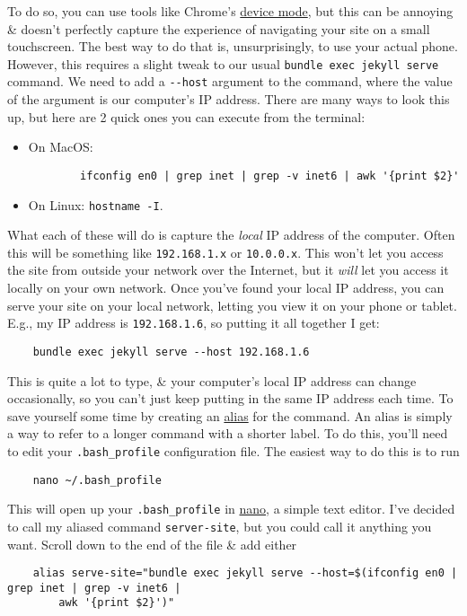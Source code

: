 \documentclass{article}
\numberwithin{equation}{section}
\begin{document}
To do so, you can use tools like Chrome's \href{https://developers.google.com/web/tools/chrome-devtools/device-mode}{device mode}, but this can be annoying \& doesn't perfectly capture the experience of navigating your site on a small touchscreen. The best way to do that is, unsurprisingly, to use your actual phone. However, this requires a slight tweak to our usual \verb|bundle exec jekyll serve| command. We need to add a \verb|--host| argument to the command, where the value of the argument is our computer's IP address. There are many ways to look this up, but here are 2 quick ones you can execute from the terminal:
\begin{itemize}
	\item On MacOS:
	\begin{verbatim}
		ifconfig en0 | grep inet | grep -v inet6 | awk '{print $2}'
	\end{verbatim}
	\item On Linux: \verb|hostname -I|.
\end{itemize}
What each of these will do is capture the \textit{local} IP address of the computer. Often this will be something like \texttt{192.168.1.x} or \texttt{10.0.0.x}. This won't let you access the site from outside your network over the Internet, but it \textit{will} let you access it locally on your own network. Once you've found your local IP address, you can serve your site on your local network, letting you view it on your phone or tablet. E.g., my IP address is \texttt{192.168.1.6}, so putting it all together I get:
\begin{verbatim}
	bundle exec jekyll serve --host 192.168.1.6
\end{verbatim}
This is quite a lot to type, \& your computer's local IP address can change occasionally, so you can't just keep putting in the same IP address each time. To save yourself some time by creating an \href{https://en.wikipedia.org/wiki/Alias_(command)}{alias} for the command. An alias is simply a way to refer to a longer command with a shorter label. To do this, you'll need to edit your \verb|.bash_profile| configuration file. The easiest way to do this is to run
\begin{verbatim}
	nano ~/.bash_profile
\end{verbatim}
This will open up your \verb|.bash_profile| in \href{https://en.wikipedia.org/wiki/GNU_nano}{nano}, a simple text editor. I've decided to call my aliased command \verb|server-site|, but you could call it anything you want. Scroll down to the end of the file \& add either
\begin{verbatim}
	alias serve-site="bundle exec jekyll serve --host=$(ifconfig en0 | grep inet | grep -v inet6 |
	    awk '{print $2}')"
\end{verbatim}
\end{document}
